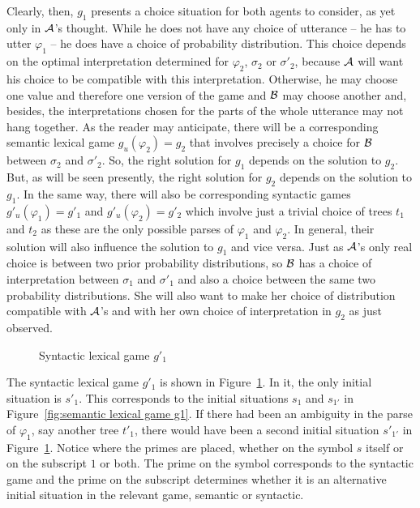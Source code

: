 Clearly, then, $g_1$ presents a choice situation for both agents to consider, as yet only in $\cal A$'s thought. While he does not have any choice of utterance -- he has to utter $\varphi_1$ -- he does have a choice of probability distribution. This choice depends on the optimal interpretation determined for $\varphi_2$, $\sigma_2$ or $\sigma'_2$, because $\cal A$ will want his choice to be compatible with this interpretation. Otherwise, he may choose one value and therefore one version of the game and $\cal B$ may choose another and, besides, the interpretations chosen for the parts of the whole utterance may not hang together. As the reader may anticipate, there will be a corresponding semantic lexical game $g_u(\varphi_2) = g_2$ that involves precisely a choice for $\cal B$ between $\sigma_2$ and $\sigma'_2$. So, the right solution for $g_1$ depends on the solution to $g_2$. But, as will be seen presently, the right solution for $g_2$ depends on the solution to $g_1$. In the same way, there will also be corresponding syntactic games $g'_u(\varphi_1) = g'_1$ and $g'_u(\varphi_2) = g'_2$ which involve just a trivial choice of trees $t_1$ and $t_2$ as these are the only possible parses of $\varphi_1$ and $\varphi_2$. In general, their solution will also influence the solution to $g_1$ and vice versa. Just as $\cal A$'s only real choice is between two prior probability distributions, so $\cal B$ has a choice of interpretation between $\sigma_1$ and $\sigma'_1$ and also a choice between the same two probability distributions. She will also want to make her choice of distribution compatible with $\cal A$'s and with her own choice of interpretation in $g_2$ as just observed.

\begin{figure}[h] 

\caption{Syntactic lexical game $g'_1$}
\label{fig:syntactic lexical game g1'}
\end{figure}

The syntactic lexical game $g'_1$ is shown in Figure~\ref{fig:syntactic lexical game g1'}. In it, the only initial situation is $s'_1$. This corresponds to the initial situations $s_1$ and $s_{1'}$ in Figure~\ref{fig:semantic lexical game g1}. If there had been an ambiguity in the parse of $\varphi_1$, say another tree $t'_1$, there would have been a second initial situation $s'_{1'}$ in Figure~\ref{fig:syntactic lexical game g1'}. Notice where the primes are placed, whether on the symbol $s$ itself or on the subscript $1$ or both. The prime on the symbol corresponds to the syntactic game and the prime on the subscript determines whether it is an alternative initial situation in the relevant game, semantic or syntactic.

